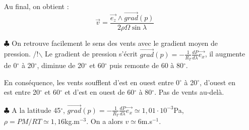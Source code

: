\documentclass{report}
\begin{document}
\begin{itemize}
	Au final, on obtient : 
		\begin{equation}
		\vec{v}=\frac{\vec{e_z}\wedge\vec{grad}(p)}{2\rho\Omega\sin\lambda}
	\end{equation}
	
	\item[$\clubsuit$] On retrouve facilement le sens des vents avec le gradient moyen de pression. /!$\backslash$ Le gradient de pression s'écrit $\vec{grad}(p)=-\frac{1}{R_T}\frac{dP}{d\lambda}\vec{e_x}$, il augmente de 0$^\circ$ à 20$^\circ$, diminue de 20$^\circ$ et 60$^\circ$ puis remonte de 60 à 80$^\circ$. 
	
	En conséquence, les vents soufflent d'est en ouest entre 0$^\circ$ à 20$^\circ$, d'ouest en est entre 20$^\circ$ et 60$^\circ$ et d'est en ouest de 60$^\circ$ à 80$^\circ$. Pas de vents au-delà.
	
	\item[$\clubsuit$] A la latitude 45$^\circ$, $\vec{grad}(p)=-\frac{1}{R_T}\frac{dP}{d\lambda}\vec{e_x}\simeq 1,01\cdot10^{-3}$Pa, $\rho=PM/RT\simeq1,16$kg.m$^{-3}$. On a alors $v\simeq6$m.s$^{-1}$.
	
\end{itemize}
\end{document}
